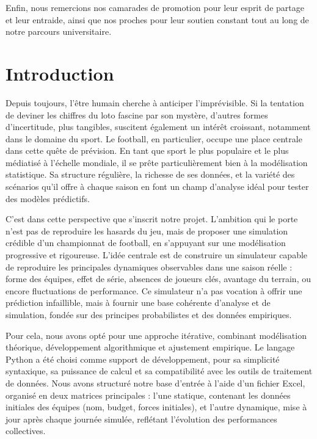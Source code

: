 \documentclass[12pt]{report}
\begin{document}
Enfin, nous remercions nos camarades de promotion pour leur esprit de partage et leur entraide, ainsi que nos proches pour leur soutien constant tout au long de notre parcours universitaire.



\tableofcontents
\newpage


\section*{Introduction}

Depuis toujours, l’être humain cherche à anticiper l’imprévisible. Si la tentation de deviner les chiffres du loto fascine par son mystère, d’autres formes d’incertitude, plus tangibles, suscitent également un intérêt croissant, notamment dans le domaine du sport. Le football, en particulier, occupe une place centrale dans cette quête de prévision. En tant que sport le plus populaire et le plus médiatisé à l’échelle mondiale, il se prête particulièrement bien à la modélisation statistique. Sa structure régulière, la richesse de ses données, et la variété des scénarios qu’il offre à chaque saison en font un champ d’analyse idéal pour tester des modèles prédictifs.

C’est dans cette perspective que s’inscrit notre projet. L’ambition qui le porte n’est pas de reproduire les hasards du jeu, mais de proposer une simulation crédible d’un championnat de football, en s’appuyant sur une modélisation progressive et rigoureuse. L’idée centrale est de construire un simulateur capable de reproduire les principales dynamiques observables dans une saison réelle : forme des équipes, effet de série, absences de joueurs clés, avantage du terrain, ou encore fluctuations de performance. Ce simulateur n’a pas vocation à offrir une prédiction infaillible, mais à fournir une base cohérente d’analyse et de simulation, fondée sur des principes probabilistes et des données empiriques.

Pour cela, nous avons opté pour une approche itérative, combinant modélisation théorique, développement algorithmique et ajustement empirique. Le langage Python a été choisi comme support de développement, pour sa simplicité syntaxique, sa puissance de calcul et sa compatibilité avec les outils de traitement de données. Nous avons structuré notre base d’entrée à l’aide d’un fichier Excel, organisé en deux matrices principales : l’une statique, contenant les données initiales des équipes (nom, budget, forces initiales), et l’autre dynamique, mise à jour après chaque journée simulée, reflétant l’évolution des performances collectives.
\end{document}
